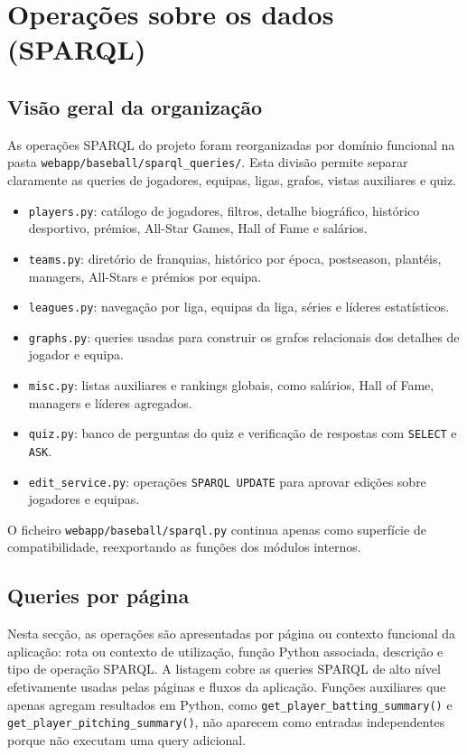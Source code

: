 \chapter{Opera\c{c}\~oes sobre os dados (SPARQL)}

\section{Vis\~ao geral da organiza\c{c}\~ao}

As opera\c{c}\~oes SPARQL do projeto foram reorganizadas por dom\'inio funcional na pasta \texttt{webapp/baseball/sparql\_queries/}. Esta divis\~ao permite separar claramente as queries de jogadores, equipas, ligas, grafos, vistas auxiliares e quiz.

\begin{itemize}[leftmargin=*]
  \item \texttt{players.py}: cat\'alogo de jogadores, filtros, detalhe biogr\'afico, hist\'orico desportivo, pr\'emios, All-Star Games, Hall of Fame e sal\'arios.
  \item \texttt{teams.py}: diret\'orio de franquias, hist\'orico por \'{e}poca, postseason, plant\'eis, managers, All-Stars e pr\'emios por equipa.
  \item \texttt{leagues.py}: navega\c{c}\~ao por liga, equipas da liga, s\'eries e l\'ideres estat\'isticos.
  \item \texttt{graphs.py}: queries usadas para construir os grafos relacionais dos detalhes de jogador e equipa.
  \item \texttt{misc.py}: listas auxiliares e rankings globais, como sal\'arios, Hall of Fame, managers e l\'ideres agregados.
  \item \texttt{quiz.py}: banco de perguntas do quiz e verifica\c{c}\~ao de respostas com \texttt{SELECT} e \texttt{ASK}.
  \item \texttt{edit\_service.py}: opera\c{c}\~oes \texttt{SPARQL UPDATE} para aprovar edi\c{c}\~oes sobre jogadores e equipas.
\end{itemize}

O ficheiro \texttt{webapp/baseball/sparql.py} continua apenas como superf\'icie de compatibilidade, reexportando as fun\c{c}\~oes dos m\'odulos internos.

\section{Queries por p\'agina}

Nesta sec\c{c}\~ao, as opera\c{c}\~oes s\~ao apresentadas por p\'agina ou contexto funcional da aplica\c{c}\~ao: rota ou contexto de utiliza\c{c}\~ao, fun\c{c}\~ao Python associada, descri\c{c}\~ao e tipo de opera\c{c}\~ao SPARQL. A listagem cobre as queries SPARQL de alto n\'ivel efetivamente usadas pelas p\'aginas e fluxos da aplica\c{c}\~ao. Fun\c{c}\~oes auxiliares que apenas agregam resultados em Python, como \texttt{get\_player\_batting\_summary()} e \texttt{get\_player\_pitching\_summary()}, n\~ao aparecem como entradas independentes porque n\~ao executam uma query adicional.

